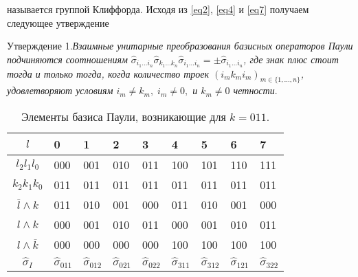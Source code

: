 \documentclass[a4paper]{report}
\begin{document}
\noindent называется группой Клиффорда. Исходя из \eqref{eq2}, \eqref{eq4} и \eqref{eq7} получаем следующее утверждение

\textsf{Утверждение 1.}\textit{Взаимные унитарные преобразования базисных операторов Паули подчиняются соотношениям ${\hat{\sigma}_{i_1\ldots i_n}\hat{\sigma}_{k_1\ldots k_n}\hat{\sigma}_{i_1\ldots i_n}=\pm\hat{\sigma}_{i_1\ldots i_n}}$, где знак плюс стоит тогда и только тогда, когда количество троек ${(i_m k_m i_m)_{m\in\{1,\ldots,n\}}}$, удовлетворяют условиям ${i_m\neq k_m},\;i_m\neq0,$ и ${k_m\neq0}$ четности}.

\begin{table}[h!]
    \centering
    \begin{tabular}{ | c | P{1cm} | P{1cm} | P{1cm} | P{1cm} | P{1cm} | P{1cm} | P{1cm} | P{1cm} | }
        \hline
        ${l}$                    & 0                      & 1                      & 2                      & 3                      & 4                      & 5                      & 6                      & 7                      \\
        \hline
        ${l_2 l_1 l_0}$          & 000                    & 001                    & 010                    & 011                    & 100                    & 101                    & 110                    & 111                    \\
        \hline
        ${k_2 k_1 k_0}$          & 011                    & 011                    & 011                    & 011                    & 011                    & 011                    & 011                    & 011                    \\
        \hline
        ${\overline{l}\wedge k}$ & 011                    & 010                    & 001                    & 000                    & 011                    & 010                    & 001                    & 000                    \\
        \hline
        ${l\wedge k}$            & 000                    & 001                    & 010                    & 011                    & 000                    & 001                    & 010                    & 011                    \\
        \hline
        ${l\wedge \overline{k}}$ & 000                    & 000                    & 000                    & 000                    & 100                    & 100                    & 100                    & 100                    \\
        \hline
        ${\hat{\sigma}_{I}}$     & ${\hat{\sigma}_{011}}$ & ${\hat{\sigma}_{012}}$ & ${\hat{\sigma}_{021}}$ & ${\hat{\sigma}_{022}}$ & ${\hat{\sigma}_{311}}$ & ${\hat{\sigma}_{312}}$ & ${\hat{\sigma}_{121}}$ & ${\hat{\sigma}_{322}}$ \\
        \hline
    \end{tabular}
    \caption{Элементы базиса Паули, возникающие для ${k=011}$.}\label{table2}
\end{table}
\end{document}
